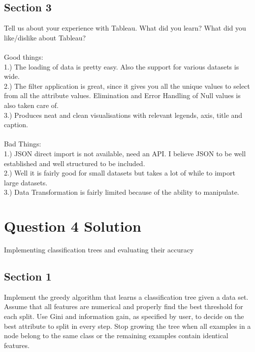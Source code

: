 \documentclass[12pt,a4paper,titlepage]{article}
\begin{document}
{{{\subsection{Section 3}{ Tell us about your experience with Tableau. What did you learn? What did you like/dislike about Tableau?\\~\\
Good things:\\
1.) The loading of data is pretty easy. Also the support for various datasets is wide.\\
2.) The filter application is great, since it gives you all the unique values to select from all the attribute values. Elimination and Error Handling of Null values is also taken care of.\\
3.) Produces neat and clean visualisations with relevant legends, axis, title and caption.
\\~\\
Bad Things:\\
1.) JSON direct import is not available, need an API. I believe JSON to be well established and well structured to be included.\\
2.) Well it is fairly good for small datasets but takes a lot of while to import large datasets.\\
3.) Data Transformation is fairly limited because of the ability to manipulate.\\
}
}
\section{Question 4 Solution}{
\centerline{Implementing classification trees and evaluating their accuracy}
\subsection{Section 1}{Implement the greedy algorithm that learns a classification tree given a data set. Assume that all features are numerical and properly find the best threshold for each split. Use Gini and information gain, as specified by user, to decide on the best attribute to split in every step. Stop growing the tree when all examples in a node belong to the same class or the remaining examples contain identical features.\\~\\

}}}}
\end{document}
